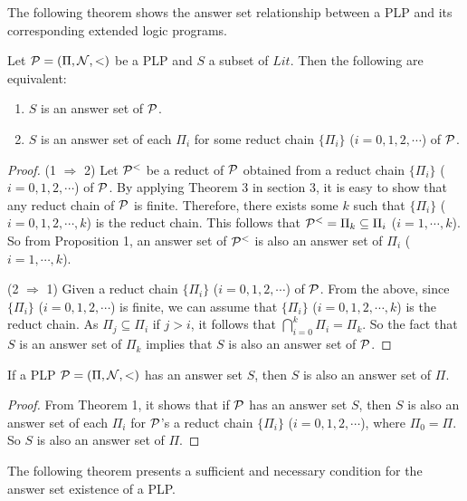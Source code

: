 \documentclass{tlp}
\begin{document}
The following theorem shows the answer set relationship between
a PLP and its corresponding extended logic programs.

\begin{theorem}
Let ${\cal P}=(\Pi,{\cal N},<)$ be a PLP and $S$ a subset of $Lit$.
Then the following are equivalent:
\begin{enumerate}
\item $S$ is an answer set of ${\cal P}$.
\item $S$ is an answer set
of each $\Pi_{i}$ for some reduct chain $\{\Pi_{i}\}$ ($i=0,1,2,\cdots$)
of ${\cal P}$.
\end{enumerate}
\end{theorem}

\noindent   
\begin{proof}
(1 $\Rightarrow$ 2) Let ${\cal P}^{<}$ be a reduct of ${\cal P}$ obtained
from a reduct chain $\{\Pi_{i}\}$ ($i=0,1,2,\cdots$)
of ${\cal P}$. By applying Theorem 3 in section 3, it is easy to show that
any reduct chain of ${\cal P}$ is finite.
Therefore,
there exists some $k$ such that $\{\Pi_{i}\}$ ($i=0,1,2,\cdots, k$)
is the reduct chain. This follows that ${\cal P}^{<}=\Pi_k\subseteq \Pi_i$
($i=1,\cdots,k$). 
So from Proposition
1, an answer set of ${\cal P}^{<}$ is also an answer set of $\Pi_{i}$
($i=1,\cdots,k$).
            
(2 $\Rightarrow$ 1) Given a reduct chain
$\{\Pi_{i}\}$ ($i=0,1,2,\cdots$) of
${\cal P}$. 
From the above, since $\{\Pi_{i}\}$ ($i=0,1,2,\cdots$) is finite, 
we can assume that $\{\Pi_{i}\}$ ($i=0,1,2,\cdots, k$)
is the reduct chain. As $\Pi_j\subseteq \Pi_i$ if $j>i$, it 
follows that $\bigcap _{i=0}^{k}\Pi_{i}=\Pi_k$. So the
fact that $S$ is an answer set of
$\Pi_k$ implies that $S$ is also an answer set of ${\cal P}$.
\end{proof} 

\begin{corollary}
If a PLP ${\cal P}=(\Pi,{\cal N},<)$ has an answer set $S$, then $S$ is also
an answer set of $\Pi$.
\end{corollary}

\noindent   
\begin{proof}
From Theorem 1, it shows that if ${\cal P}$ has an answer set
$S$, then $S$ is also an answer set of each $\Pi_{i}$ for
${\cal P}$'s a reduct chain $\{\Pi_{i}\}$ ($i=0, 1, 2, \cdots$),
where $\Pi_{0}=\Pi$. So $S$ is also an answer set of $\Pi$.
\end{proof} 

The following theorem presents a sufficient and necessary
condition for the answer set existence of a PLP.
\end{document}
